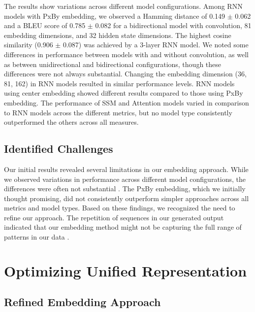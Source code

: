 \documentclass[10pt,a4paper]{article}
\begin{document}
The results show variations across different model configurations. Among RNN models with PxBy embedding, we observed a Hamming distance of 0.149 $\pm$ 0.062 and a BLEU score of 0.785 $\pm$ 0.082 for a bidirectional model with convolution, 81 embedding dimensions, and 32 hidden state dimensions. The highest cosine similarity (0.906 $\pm$ 0.087) was achieved by a 3-layer RNN model. We noted some differences in performance between models with and without convolution, as well as between unidirectional and bidirectional configurations, though these differences were not always substantial. Changing the embedding dimension (36, 81, 162) in RNN models resulted in similar performance levels. RNN models using center embedding showed different results compared to those using PxBy embedding. The performance of SSM and Attention models varied in comparison to RNN models across the different metrics, but no model type consistently outperformed the others across all measures.

\subsection{Identified Challenges}

Our initial results revealed several limitations in our embedding approach. While we observed variations in performance across different model configurations, the differences were often not substantial \cite{wang2020deep}. The PxBy embedding, which we initially thought promising, did not consistently outperform simpler approaches across all metrics and model types. Based on these findings, we recognized the need to refine our approach. The repetition of sequences in our generated output indicated that our embedding method might not be capturing the full range of patterns in our data \cite{bengio2013representation}.

\section{Optimizing Unified Representation}

\subsection{Refined Embedding Approach}
\end{document}
